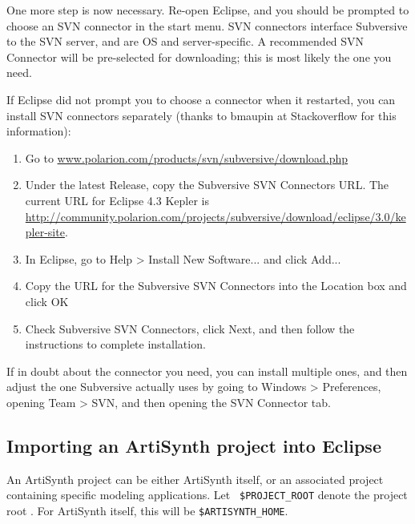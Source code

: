One more step is now necessary. Re-open Eclipse, and you should be
prompted to choose an SVN connector in the start menu.  SVN connectors
interface Subversive to the SVN server, and are OS and
server-specific. A recommended SVN Connector will be pre-selected for
downloading; this is most likely the one you need.

If Eclipse did not prompt you to choose a connector when it restarted,
you can install SVN connectors separately (thanks to bmaupin at
Stackoverflow for this information):

\begin{enumerate}

\item  Go to 
\href{http://www.polarion.com/products/svn/subversive/download.php}
{www.polarion.com/products/svn/subversive/download.php}

\item Under the latest {\sf Release}, copy the Subversive SVN
Connectors URL. The current URL for Eclipse 4.3 Kepler
is \href{http://community.polarion.com/projects/subversive/download/eclipse/3.0/kepler-site/}
{http://community.polarion.com/projects/subversive/download/eclipse/3.0/kepler-site}.

\item In Eclipse, go to {\sf Help > Install New Software...} and 
click {\sf Add...}  

\item Copy the URL for the Subversive SVN Connectors into the {\sf
Location} box and click {\sf OK}

\item Check {\sf Subversive SVN Connectors}, click {\sf Next}, and
then follow the instructions to complete installation.

\end{enumerate}

If in doubt about the connector you need, you can install multiple
ones, and then adjust the one Subversive actually uses by going to
{\sf Windows > Preferences}, opening {\sf Team > SVN}, and then
opening the {\sf SVN Connector} tab.

\subsection{Importing an ArtiSynth project into Eclipse}
\label{importingArtisynth}

An ArtiSynth project can be either ArtiSynth itself, or an associated
project containing specific modeling applications. Let {\tt
\$PROJECT\_ROOT} denote the project root \directory. For ArtiSynth
itself, this will be {\tt \$ARTISYNTH\_HOME}.

